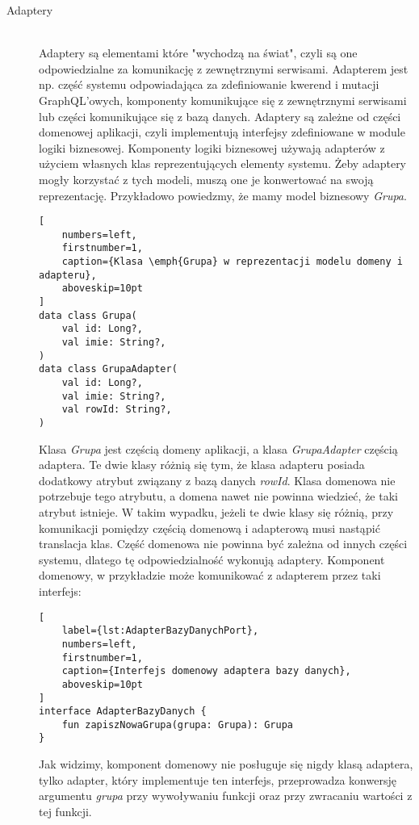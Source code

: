 \begin{description}
\vspace{0.4cm}

\item[Adaptery] \hfill \\ Adaptery są elementami które "wychodzą na świat", czyli są one odpowiedzialne za komunikację z zewnętrznymi serwisami. Adapterem jest np. część systemu odpowiadająca za zdefiniowanie kwerend i mutacji GraphQL'owych, komponenty komunikujące się z zewnętrznymi serwisami lub części komunikujące się z bazą danych. Adaptery są zależne od części domenowej aplikacji, czyli implementują interfejsy zdefiniowane w module logiki biznesowej. Komponenty logiki biznesowej używają adapterów z użyciem własnych klas reprezentujących elementy systemu. Żeby adaptery mogły korzystać z tych modeli, muszą one je konwertować na swoją reprezentację. Przykładowo powiedzmy, że mamy model biznesowy \emph{Grupa}.

\begin{addmargin}[6mm]{0mm}
\begin{lstlisting}[
    numbers=left,
    firstnumber=1,
    caption={Klasa \emph{Grupa} w reprezentacji modelu domeny i adapteru},
    aboveskip=10pt
]
data class Grupa(
    val id: Long?,
    val imie: String?,
)
data class GrupaAdapter(
    val id: Long?,
    val imie: String?,
    val rowId: String?,
)
\end{lstlisting}
\end{addmargin}

Klasa \emph{Grupa} jest częścią domeny aplikacji, a klasa \emph{GrupaAdapter} częścią adaptera. Te dwie klasy różnią się tym, że klasa adapteru posiada dodatkowy atrybut związany z bazą danych \emph{rowId}. Klasa domenowa nie potrzebuje tego atrybutu, a domena nawet nie powinna wiedzieć, że taki atrybut istnieje. W takim wypadku, jeżeli te dwie klasy się różnią, przy komunikacji pomiędzy częścią domenową i adapterową musi nastąpić translacja klas. Część domenowa nie powinna być zależna od innych części systemu, dlatego tę odpowiedzialność wykonują adaptery. Komponent domenowy, w przykładzie może komunikować z adapterem przez taki interfejs:
\begin{addmargin}[6mm]{0mm}
\begin{lstlisting}[
    label={lst:AdapterBazyDanychPort},
    numbers=left,
    firstnumber=1,
    caption={Interfejs domenowy adaptera bazy danych},
    aboveskip=10pt
]
interface AdapterBazyDanych {
    fun zapiszNowaGrupa(grupa: Grupa): Grupa
}
\end{lstlisting}
\end{addmargin}
Jak widzimy, komponent domenowy nie posługuje się nigdy klasą adaptera, tylko adapter, który implementuje ten interfejs, przeprowadza konwersję argumentu \emph{grupa} przy wywoływaniu funkcji oraz przy zwracaniu wartości z tej funkcji.


\end{description}
